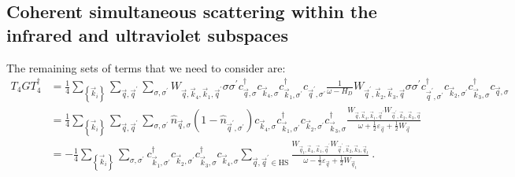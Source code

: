 \documentclass{revtex4-2}
\begin{document}
\subsection{Coherent simultaneous scattering within the infrared and ultraviolet subspaces}
The remaining sets of terms that we need to consider are:
\begin{equation}\begin{aligned}
	T_4 G T_4^\dagger &= \frac{1}{4}\sum_{\left\{ \vec k_i \right\} }\sum_{\vec q,\vec q^\prime}\sum_{\sigma,\sigma^\prime}  W_{\vec q,\vec k_4, \vec k_1, \vec q^\prime} \sigma\sigma^\prime c^\dagger_{\vec q,\sigma}c_{\vec k_4,\sigma}c^\dagger_{\vec k_1,\sigma^\prime}c_{\vec q^\prime,\sigma^\prime} \frac{1}{\omega - H_D}W_{\vec q^\prime, \vec k_2, \vec k_3, \vec q} \sigma\sigma^\prime c^\dagger_{\vec q^\prime,\sigma^\prime}c_{\vec k_2,\sigma^\prime}c^\dagger_{\vec k_3,\sigma}c_{\vec q,\sigma}\\
		  &= \frac{1}{4}\sum_{\left\{ \vec k_i \right\} }\sum_{\vec q,\vec q^\prime}\sum_{\sigma,\sigma^\prime} \hat n_{\vec q,\sigma} \left(1 - \hat n_{\vec q^\prime,\sigma^\prime}\right) c_{\vec k_4,\sigma}c^\dagger_{\vec k_1,\sigma^\prime}c_{\vec k_2,\sigma^\prime}c^\dagger_{\vec k_3,\sigma} \frac{W_{\vec q,\vec k_4, \vec k_1, \vec q^\prime} W_{\vec q^\prime, \vec k_2, \vec k_3, \vec q}}{\omega + \frac{1}{2}\varepsilon_{\vec q}  + \frac{1}{2}W_{\vec q}}  \\
		  &= -\frac{1}{4}\sum_{\left\{ \vec k_i \right\} }\sum_{\sigma,\sigma^\prime} c^\dagger_{\vec k_1,\sigma^\prime}c_{\vec k_2,\sigma^\prime}c^\dagger_{\vec k_3,\sigma}c_{\vec k_4,\sigma} \sum_{\vec q, \vec q^\prime \in \text{HS}}\frac{W_{\vec q_t,\vec k_4, \vec k_1, \vec q^\prime} W_{\vec q^\prime, \vec k_2, \vec k_3, \vec q_t}}{\omega - \frac{1}{2}\varepsilon_{\vec q}  + \frac{1}{2}W_{\vec q_t}}~.
\end{aligned}\end{equation}
\end{document}
